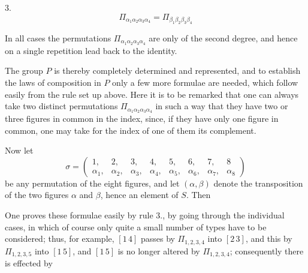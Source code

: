 
3.\ 
\[
\Pi_{\alpha_1\alpha_2\alpha_3\alpha_4} = \Pi_{\beta_1\beta_2\beta_3\beta_4}
\]

In all cases the permutations $\Pi_{\alpha_1\alpha_2\alpha_3\alpha_4}$ are only of the second degree, and hence on a single repetition lead back to the identity.

The group $P$ is thereby completely determined and represented, and to establish the laws of composition in $P$ only a few more formulae are needed, which follow easily from the rule set up above. Here it is to be remarked that one can always take two distinct permutations $\Pi_{\alpha_1\alpha_2\alpha_3\alpha_4}$ in such a way that they have two or three figures in common in the index, since, if they have only one figure in common, one may take for the index of one of them its complement.

Now let
\[
\sigma = \begin{pmatrix} 1, & 2, & 3, & 4, & 5, & 6, & 7, & 8 \\ \alpha_1, & \alpha_2, & \alpha_3, & \alpha_4, & \alpha_5, & \alpha_6, & \alpha_7, & \alpha_8 \end{pmatrix}
\]
be any permutation of the eight figures, and let $(\alpha, \beta)$ denote the transposition of the two figures $\alpha$ and $\beta$, hence an element of $S$. Then

One proves these formulae easily by rule 3., by going through the individual cases, in which of course only quite a small number of types have to be considered; thus, for example, $[1\,4]$ passes by $\Pi_{1,2,3,4}$ into $[2\,3]$, and this by $\Pi_{1,2,3,5}$ into $[1\,5]$, and $[1\,5]$ is no longer altered by $\Pi_{1,2,3,4}$; consequently there is effected by
